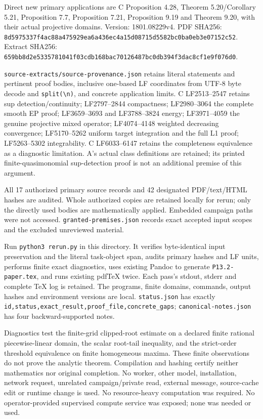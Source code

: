\documentclass[
  10pt,
]{article}
\begin{document}
Direct new primary applications are C Proposition 4.28, Theorem
5.20/Corollary 5.21, Proposition 7.7, Proposition 7.21, Proposition 9.19
and Theorem 9.20, with their actual projective domains. Version:
1801.08229v4. PDF SHA256:
\texttt{8d5975337f4ac88a475929ea6a436ec4a15d08715d5582bc0ba0eb3e07152c52}.
Extract SHA256:
\texttt{659bb8d2e5335781041f03cdb168bac70126487bc0db394f3dac8cf1e9f076d0}.

\texttt{source-extracts/source-provenance.json} retains literal
statements and pertinent proof bodies, inclusive one-based LF
coordinates from UTF-8 byte decode and
\texttt{split(\textquotesingle{}\textbackslash{}n\textquotesingle{})},
and concrete application limits. C LF2513--2547 retains sup
detection/continuity; LF2797--2844 compactness; LF2980--3064 the
complete smooth EP proof; LF3659--3693 and LF3788--3824 energy;
LF3971--4059 the genuine projective mixed operator; LF4074--4148
weighted decreasing convergence; LF5170--5262 uniform target integration
and the full L1 proof; LF5263--5302 integrability. C LF6033--6147
retains the completeness equivalence as a diagnostic limitation. A's
actual class definitions are retained; its printed finite-quasimonomial
sup-detection proof is not an additional premise of this argument.

All 17 authorized primary source records and 42 designated PDF/text/HTML
hashes are audited. Whole authorized copies are retained locally for
rerun; only the directly used bodies are mathematically applied.
Embedded campaign paths were not accessed.
\texttt{granted-premises.json} records exact accepted input scopes and
the excluded unreviewed material.

Run \texttt{python3\ rerun.py} in this directory. It verifies
byte-identical input preservation and the literal task-object span,
audits primary hashes and LF units, performs finite exact diagnostics,
uses existing Pandoc to generate \texttt{P13.2-paper.tex}, and runs
existing pdfTeX twice. Each pass's stdout, stderr and complete TeX log
is retained. The programs, finite domains, commands, output hashes and
environment versions are local. \texttt{status.json} has exactly
\texttt{id,status,exact\_result,proof\_file,concrete\_gaps};
\texttt{canonical-notes.json} has four backward-supported notes.

Diagnostics test the finite-grid clipped-root estimate on a declared
finite rational piecewise-linear domain, the scalar root-tail
inequality, and the strict-order threshold equivalence on finite
homogeneous maxima. These finite observations do not prove the analytic
theorem. Compilation and hashing certify neither mathematics nor
original completion. No worker, other model, installation, network
request, unrelated campaign/private read, external message, source-cache
edit or runtime change is used. No resource-heavy computation was
required. No operator-provided supervised compute service was exposed;
none was needed or used.
\end{document}
